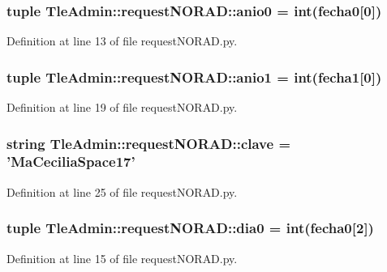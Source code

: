 \subsubsection[{anio0}]{\setlength{\rightskip}{0pt plus 5cm}tuple {\bf \-Tle\-Admin\-::request\-N\-O\-R\-A\-D\-::anio0} = int({\bf fecha0}[0])}\label{namespace_tle_admin_1_1request_n_o_r_a_d_a3d4019e28b061a78b9e519ea9ba027c0}


\-Definition at line 13 of file request\-N\-O\-R\-A\-D.\-py.

\subsubsection[{anio1}]{\setlength{\rightskip}{0pt plus 5cm}tuple {\bf \-Tle\-Admin\-::request\-N\-O\-R\-A\-D\-::anio1} = int({\bf fecha1}[0])}\label{namespace_tle_admin_1_1request_n_o_r_a_d_a6bb7f8cd88be9e0bffc51603e0f3d319}


\-Definition at line 19 of file request\-N\-O\-R\-A\-D.\-py.

\subsubsection[{clave}]{\setlength{\rightskip}{0pt plus 5cm}string {\bf \-Tle\-Admin\-::request\-N\-O\-R\-A\-D\-::clave} = '\-Ma\-Cecilia\-Space17'}\label{namespace_tle_admin_1_1request_n_o_r_a_d_afadac1f1e4bca3b03c68975c4471b7fb}


\-Definition at line 25 of file request\-N\-O\-R\-A\-D.\-py.

\subsubsection[{dia0}]{\setlength{\rightskip}{0pt plus 5cm}tuple {\bf \-Tle\-Admin\-::request\-N\-O\-R\-A\-D\-::dia0} = int({\bf fecha0}[2])}\label{namespace_tle_admin_1_1request_n_o_r_a_d_a00a2edf8726944b065c2bcb013f1e80b}


\-Definition at line 15 of file request\-N\-O\-R\-A\-D.\-py.

